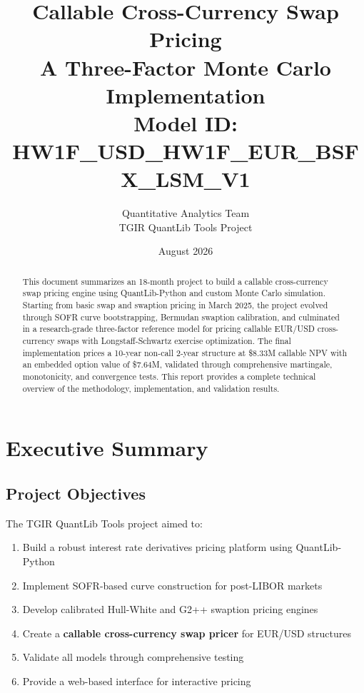 \documentclass[10pt,a4paper]{article}
\title{\textbf{Callable Cross-Currency Swap Pricing}\\
\Large A Three-Factor Monte Carlo Implementation\\[0.5cm]
\normalsize Model ID: HW1F\_USD\_HW1F\_EUR\_BSFX\_LSM\_V1}
\author{Quantitative Analytics Team\\TGIR QuantLib Tools Project}
\date{August 2026}
\begin{document}
\small

\maketitle
\thispagestyle{empty}

\begin{abstract}
This document summarizes an 18-month project to build a callable cross-currency swap pricing engine using QuantLib-Python and custom Monte Carlo simulation. Starting from basic swap and swaption pricing in March 2025, the project evolved through SOFR curve bootstrapping, Bermudan swaption calibration, and culminated in a research-grade three-factor reference model for pricing callable EUR/USD cross-currency swaps with Longstaff-Schwartz exercise optimization. The final implementation prices a 10-year non-call 2-year structure at \$8.33M callable NPV with an embedded option value of \$7.64M, validated through comprehensive martingale, monotonicity, and convergence tests. This report provides a complete technical overview of the methodology, implementation, and validation results.
\end{abstract}

\tableofcontents
\newpage

\section{Executive Summary}

\subsection{Project Objectives}

The TGIR QuantLib Tools project aimed to:

\begin{enumerate}
    \item Build a robust interest rate derivatives pricing platform using QuantLib-Python
    \item Implement SOFR-based curve construction for post-LIBOR markets
    \item Develop calibrated Hull-White and G2++ swaption pricing engines
    \item Create a \textbf{callable cross-currency swap pricer} for EUR/USD structures
    \item Validate all models through comprehensive testing
    \item Provide a web-based interface for interactive pricing
\end{enumerate}
\end{document}
